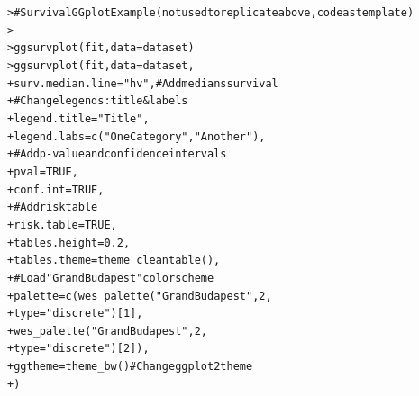\documentclass[12pt]{article}\usepackage[]{graphicx}\usepackage[]{color}
\makeatletter
\newcommand{\hlnum}[1]{\textcolor[rgb]{0.82,0.78,0.62}{#1}}%
\newcommand{\hlstr}[1]{\textcolor[rgb]{0.82,0.78,0.62}{#1}}%
\newcommand{\hlcom}[1]{\textcolor[rgb]{0.404,0.408,0.42}{#1}}%
\newcommand{\hlstd}[1]{\textcolor[rgb]{0.882,0.878,0.898}{#1}}%
\newcommand{\hlkwc}[1]{\textcolor[rgb]{0.812,0.522,0.388}{#1}}%
\newcommand{\hlkwd}[1]{\textcolor[rgb]{0.733,0.388,0.812}{#1}}%
\newenvironment{kframe}{%
 \def\at@end@of@kframe{}%
 \ifinner\ifhmode%
  \def\at@end@of@kframe{\end{minipage}}%
  \begin{minipage}{\columnwidth}%
 \fi\fi%
 \def\FrameCommand##1{\hskip\@totalleftmargin \hskip-\fboxsep
 \colorbox{shadecolor}{##1}\hskip-\fboxsep
     \hskip-\linewidth \hskip-\@totalleftmargin \hskip\columnwidth}%
 \MakeFramed {\advance\hsize-\width
   \@totalleftmargin\z@ \linewidth\hsize
   \@setminipage}}%
 {\par\unskip\endMakeFramed%
 \at@end@of@kframe}
\newenvironment{knitrout}{}{} %
\makeatother
\begin{document}
\begin{flushleft}
\begin{knitrout}
\color{fgcolor}\begin{kframe}
\begin{alltt}
\hlstd{> }\hlcom{#Survival GGplot Example (not used to replicate above, code as template)}
\hlstd{> }
\hlstd{> }    \hlkwd{ggsurvplot}\hlstd{(fit,} \hlkwc{data} \hlstd{= dataset)}
\hlstd{> }\hlkwd{ggsurvplot}\hlstd{(fit,} \hlkwc{data} \hlstd{= dataset,}
\hlstd{+ }                \hlkwc{surv.median.line} \hlstd{=} \hlstr{"hv"}\hlstd{,}  \hlcom{# Add medians survival}
\hlstd{+ }                        \hlcom{# Change legends: title & labels}
\hlstd{+ }                \hlkwc{legend.title} \hlstd{=} \hlstr{"Title"}\hlstd{,}
\hlstd{+ }                \hlkwc{legend.labs} \hlstd{=} \hlkwd{c}\hlstd{(}\hlstr{"One Category"}\hlstd{,} \hlstr{"Another"}\hlstd{),}
\hlstd{+ }                        \hlcom{# Add p-value and confidence intervals}
\hlstd{+ }                \hlkwc{pval} \hlstd{=} \hlnum{TRUE}\hlstd{,}
\hlstd{+ }                \hlkwc{conf.int} \hlstd{=} \hlnum{TRUE}\hlstd{,}
\hlstd{+ }                        \hlcom{# Add risk table}
\hlstd{+ }                \hlkwc{risk.table} \hlstd{=} \hlnum{TRUE}\hlstd{,}
\hlstd{+ }                \hlkwc{tables.height} \hlstd{=} \hlnum{0.2}\hlstd{,}
\hlstd{+ }                \hlkwc{tables.theme} \hlstd{=} \hlkwd{theme_cleantable}\hlstd{(),}
\hlstd{+ }                \hlcom{#Load "GrandBudapest" color scheme}
\hlstd{+ }                \hlkwc{palette} \hlstd{=} \hlkwd{c}\hlstd{(}\hlkwd{wes_palette}\hlstd{(}\hlstr{"GrandBudapest"}\hlstd{,} \hlnum{2}\hlstd{,}
\hlstd{+ }                \hlkwc{type} \hlstd{=} \hlstr{"discrete"}\hlstd{)[}\hlnum{1}\hlstd{],}
\hlstd{+ }                \hlkwd{wes_palette}\hlstd{(}\hlstr{"GrandBudapest"}\hlstd{,} \hlnum{2}\hlstd{,}
\hlstd{+ }                \hlkwc{type} \hlstd{=} \hlstr{"discrete"}\hlstd{)[}\hlnum{2}\hlstd{]),}
\hlstd{+ }                \hlkwc{ggtheme} \hlstd{=} \hlkwd{theme_bw}\hlstd{()}  \hlcom{#Change ggplot2 theme}
\hlstd{+ }              \hlstd{)}
\end{alltt}
\end{kframe}
\end{knitrout}


\newpage


\end{flushleft}
\end{document}
